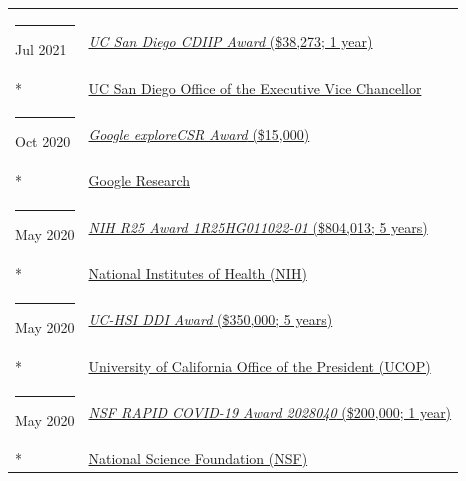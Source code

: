 \documentclass[margin,line]{res}
\begin{document}
\begin{resume}
\begin{longtable}{@{}p{0.7in}p{4in}}
\hspace*{-4mm} \rule{-1mm}{5mm} Jul 2021 & \href{https://academicaffairs.ucsd.edu/evc/cdiip.html}{\textit{UC San Diego CDIIP Award} (\$38,273; 1 year)}\\*
\hspace*{-4mm} \hspace*{-4mm} & \hspace{4mm} \href{https://academicaffairs.ucsd.edu/evc/cdiip.html}{UC San Diego Office of the Executive Vice Chancellor}\\
\hspace*{-4mm} \rule{-1mm}{5mm} Oct 2020 & \href{https://research.google/outreach/explore-csr/recipients/?category=2020}{\textit{Google exploreCSR Award} (\$15,000)}\\*
\hspace*{-4mm} \hspace*{-4mm} & \hspace{4mm} \href{https://research.google/}{Google Research}\\
\hspace*{-4mm} \rule{-1mm}{5mm} May 2020 & \href{https://reporter.nih.gov/project-details/9935824}{\textit{NIH R25 Award 1R25HG011022-01} (\$804,013; 5 years)}\\*
\hspace*{-4mm} \hspace*{-4mm} & \hspace{4mm} \href{https://nih.gov}{National Institutes of Health (NIH)}\\
\hspace*{-4mm} \rule{-1mm}{5mm} May 2020 & \href{https://www.ucop.edu/graduate-studies/initiatives-outreach/uc-hsi-ddi.html}{\textit{UC-HSI DDI Award} (\$350,000; 5 years)}\\*
\hspace*{-4mm} \hspace*{-4mm} & \hspace{4mm} \href{https://www.ucop.edu/}{University of California Office of the President (UCOP)}\\
\hspace*{-4mm} \rule{-1mm}{5mm} May 2020 & \href{https://www.nsf.gov/awardsearch/showAward?AWD_ID=2028040}{\textit{NSF RAPID COVID-19 Award 2028040} (\$200,000; 1 year)}\\*
\hspace*{-4mm} \hspace*{-4mm} & \hspace{4mm} \href{https://nsf.gov}{National Science Foundation (NSF)}\\

\end{longtable}
\end{resume}
\end{document}
